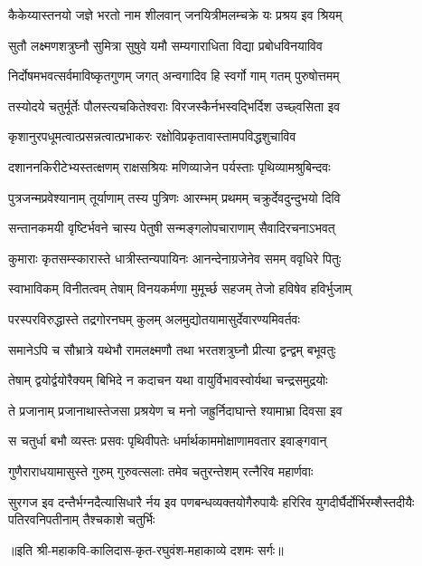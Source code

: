 \twolineshloka
{कैकेय्यास्तनयो जज्ञे भरतो नाम शीलवान्}
{जनयित्रीमलम्चक्रे यः प्रश्रय इव श्रियम्} %

\twolineshloka
{सुतौ लक्ष्मणशत्रुघ्नौ सुमित्रा सुषुवे यमौ}
{सम्यगाराधिता विद्या प्रबोधविनयाविव} %

\twolineshloka
{निर्दोषमभवत्सर्वमाविष्कृतगुणम् जगत्}
{अन्वगादिव हि स्वर्गो गाम् गतम् पुरुषोत्तमम्} %

\twolineshloka
{तस्योदये चतुर्मूर्तेः पौलस्त्यचकितेश्वराः}
{विरजस्कैर्नभस्वद्भिर्दिश उच्छ्वसिता इव} %

\twolineshloka
{कृशानुरपधूमत्वात्प्रसन्नत्वात्प्रभाकरः}
{रक्षोविप्रकृतावास्तामपविद्धशुचाविव} %

\twolineshloka
{दशाननकिरीटेभ्यस्तत्क्षणम् राक्षसश्रियः}
{मणिव्याजेन पर्यस्ताः पृथिव्यामश्रुबिन्दवः} %

\twolineshloka
{पुत्रजन्मप्रवेश्यानाम् तूर्याणाम् तस्य पुत्रिणः}
{आरम्भम् प्रथमम् चक्रुर्देवदुन्दुभयो दिवि} %

\twolineshloka
{सन्तानकमयी वृष्टिर्भवने चास्य पेतुषी}
{सन्मङ्गलोपचाराणाम् सैवादिरचनाऽभवत्} %

\twolineshloka
{कुमाराः कृतसम्स्कारास्ते धात्रीस्तन्यपायिनः}
{आनन्देनाग्रजेनेव समम् ववृधिरे पितुः} %

\twolineshloka
{स्वाभाविकम् विनीतत्वम् तेषाम् विनयकर्मणा}
{मुमूर्च्छ सहजम् तेजो हविषेव हविर्भुजाम्} %

\twolineshloka
{परस्परविरुद्धास्ते तद्रगोरनघम् कुलम्}
{अलमुद्योतयामासुर्देवारण्यमिवर्तवः} %

\twolineshloka
{समानेऽपि च सौभ्रात्रे यथेभौ रामलक्ष्मणौ}
{तथा भरतशत्रुघ्नौ प्रीत्या द्वन्द्वम् बभूवतुः} %

\twolineshloka
{तेषाम् द्वयोर्द्वयोरैक्यम् बिभिदे न कदाचन}
{यथा वायुर्विभावस्वोर्यथा चन्द्रसमुद्रयोः} %

\twolineshloka
{ते प्रजानाम् प्रजानाथास्तेजसा प्रश्रयेण च}
{मनो जह्रुर्निदाघान्ते श्यामाभ्रा दिवसा इव} %

\twolineshloka
{स चतुर्धा बभौ व्यस्तः प्रसवः पृथिवीपतेः}
{धर्मार्थकाममोक्षाणामवतार इवाङ्गवान्} %

\twolineshloka
{गुणैराराधयामासुस्ते गुरुम् गुरुवत्सलाः}
{तमेव चतुरन्तेशम् रत्नैरिव महार्णवाः} %

\fourlineindentedshloka
{सुरगज इव दन्तैर्भग्नदैत्यासिधारै}
{र्नय इव पणबन्धव्यक्तयोगैरुपायैः}
{हरिरिव युगदीर्घैर्दोर्भिरम्शैस्तदीयैः}
{पतिरवनिपतीनाम् तैश्चकाशे चतुर्भिः} %

॥इति श्री-महाकवि-कालिदास-कृत-रघुवंश-महाकाव्ये दशमः सर्गः॥
